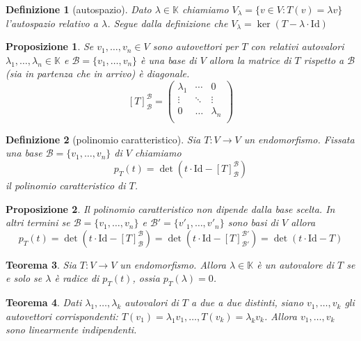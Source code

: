 \documentclass[9pt, a4paper]{article}
\newcommand{\K}{\mathbb{K}}
\newcommand{\Id}{\mathrm{Id}}
\theoremstyle{mythm}
\newtheorem{definition}{Definizione}[section]
\newtheorem{thm}{Teorema}[section]
\newtheorem{prop}[thm]{Proposizione}
\begin{document}
\begin{definition}[autospazio]
	Dato $ \lambda \in \K $ chiamiamo $ V_\lambda = \{v \in V : T(v) = \lambda v\} $ l'autospazio relativo a $ \lambda $. Segue dalla definizione che $ V_\lambda = \ker \left(T - \lambda \cdot \Id\right) $
\end{definition}

\begin{prop}
	Se $ v_1, \ldots, v_n \in V $ sono autovettori per $ T $ con relativi autovalori $ \lambda_1, \ldots, \lambda_n \in \K $ e $ \mathscr{B} = \{v_1, \ldots, v_n\} $ è una base di $ V $ allora la matrice di $ T $ rispetto a $ \mathscr{B} $ (sia in partenza che in arrivo) è diagonale. 
	\[[T]_{\mathscr{B}}^{\mathscr{B}} = 
	\begin{pmatrix}
	\lambda_1 & \cdots & 0 \\
	\vdots & \ddots & \vdots \\
	0 & \ldots & \lambda_n \\
	\end{pmatrix}\]
\end{prop}

\begin{definition}[polinomio caratteristico]
	Sia $ T \colon V \to V $ un endomorfismo. Fissata una base $ \mathscr{B} = \{v_1, \ldots, v_n\} $ di $ V $ chiamiamo \[p_T(t) = \det \left(t \cdot \Id - [T]_{\mathscr{B}}^{\mathscr{B}}\right)\] il polinomio caratteristico di $ T $. 
\end{definition}

\begin{prop}
	Il polinomio caratteristico non dipende dalla base scelta. In altri termini se $ \mathscr{B} = \{v_1, \ldots, v_n\} $ e $ \mathscr{B}' = \{v'_1, \ldots, v'_n\} $ sono basi di $ V $ allora \[p_T(t) = \det \left(t \cdot \Id - [T]_{\mathscr{B}}^{\mathscr{B}}\right) = \det \left(t \cdot \Id - [T]_{\mathscr{B}'}^{\mathscr{B}'}\right) = \det \left(t \cdot \Id - T\right)\]
\end{prop}

\begin{thm}
	Sia $ T \colon V \to V $ un endomorfismo. Allora $ \lambda \in \K $ è un autovalore di $ T $ se e solo se $ \lambda $ è radice di $ p_T(t) $, ossia $ p_T(\lambda) = 0 $. 
\end{thm}

\begin{thm}
	Dati $ \lambda_1, \ldots, \lambda_k $ autovalori di $ T $ a due a due distinti, siano $ v_1, \ldots, v_k $ gli autovettori corrispondenti: $ T(v_1) = \lambda_1 v_1, \ldots, T(v_k) = \lambda_k v_k $. Allora $ v_1, \ldots, v_k $ sono linearmente indipendenti. 
\end{thm}
\end{document}
